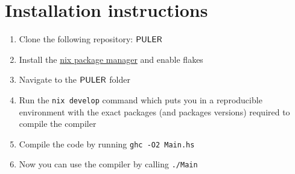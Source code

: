 \chapter{Installation instructions}
\label{installation}
\thispagestyle{myheadings}

\begin{enumerate}
    \item Clone the following repository: \href{https://github.com/bmabsout/PULER.git}{$\mathsf{PULER}$}
    \item Install the \href{https://nixos.org/nix/}{nix package manager} and enable flakes
    \item Navigate to the $\mathsf{PULER}$ folder
    \item Run the \texttt{nix develop} command which puts you in a reproducible environment with the exact packages (and packages versions) required to compile the compiler
    \item Compile the code by running \texttt{ghc -O2 Main.hs}
    \item Now you can use the compiler by calling \texttt{./Main}
\end{enumerate}
